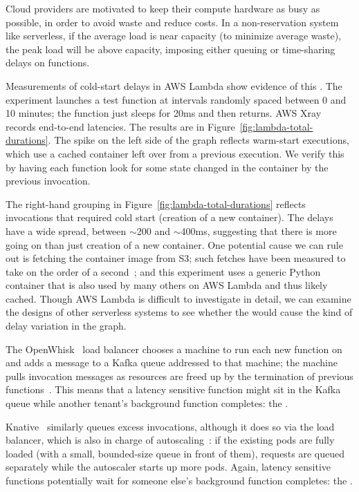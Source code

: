 Cloud providers are motivated to keep their compute hardware as busy
as possible, in order to avoid waste and reduce costs. In a
non-reservation system like serverless, if the average load is near
capacity (to minimize average waste), the peak load will be above
capacity, imposing either queuing or time-sharing delays on functions.


Measurements of cold-start delays in AWS Lambda show evidence
of
this \problem{}.
The experiment launches a test function at intervals randomly
spaced between 0 and 10 minutes; the function
just sleeps for 20ms and then returns. AWS Xray~\cite{aws-xray}
records end-to-end latencies.
The results are in Figure~\ref{fig:lambda-total-durations}. The spike
on the left side of the graph reflects warm-start executions,
which use a cached container left over from a previous execution.
We verify this by having each function look for some state changed
in the container by the previous invocation.

The right-hand grouping in Figure~\ref{fig:lambda-total-durations}
reflects invocations that required cold start (creation of a new
container). The delays have a wide spread, between $\sim$200 and
$\sim$400ms, suggesting that there is more going on than just creation
of a new container. One potential cause we can rule out is fetching
the container image from S3; such fetches have been measured to take
on the order of a second~\cite{sigmaos}; and this experiment uses a
generic Python container that is also used by many others on AWS
Lambda and thus likely cached. Though AWS Lambda is difficult to
investigate in detail, we can examine the designs of other serverless
systems to see whether the {\problem} would cause the kind of delay
variation in the graph.

The OpenWhisk~\cite{openwhisk} load balancer chooses a machine to run
each new function on and adds a message to a Kafka queue addressed to
that machine; the machine pulls invocation messages as resources are
freed up by the termination of previous
functions~\cite{openwhisk-sched}. This means that 
a latency sensitive function might sit in the Kafka queue while
another tenant's background function completes: the \problem{}.

Knative~\cite{knative} similarly queues excess invocations, although it does
so via the load balancer, which is also in charge of
autoscaling~\cite{knative-sched}: if the existing pods are fully loaded (with a
small, bounded-size queue in front of them), requests are queued separately
while the autoscaler starts up more pods. Again, latency sensitive
functions potentially wait for someone else's background function
completes: the \problem{}.

